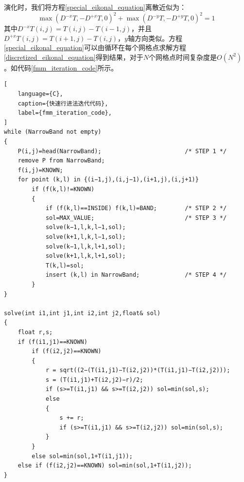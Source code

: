 演化时，我们将方程\ref{special_eikonal_equation}离散近似为：
\begin{equation}
    \label{discretized_eikonal_equation}
    \max(D^{-x}T, -D^{+x}T, 0)^2 + \max(D^{-y}T, -D^{+y}T, 0)^2 = 1
\end{equation}
其中$D^{-x}T(i, j) = T(i, j) - T(i - 1, j)$，并且$D^{+x}T(i, j) = T(i + 1, j) - T(i, j)$，$y$轴方向类似。方程\ref{special_eikonal_equation}可以由循环在每个网格点求解方程\ref{discretized_eikonal_equation}得到结果，对于$N$个网格点时间复杂度是$O(N^2)$。如代码\ref{fmm_iteration_code}所示。
\begin{lstlisting}[
    language={C},
    caption={快速行进法迭代代码},
    label={fmm_iteration_code},
]
while (NarrowBand not empty)
{
    P(i,j)=head(NarrowBand); 						/* STEP 1 */
    remove P from NarrowBand;
    f(i,j)=KNOWN;
    for point (k,l) in {(i−1,j),(i,j−1),(i+1,j),(i,j+1)}
        if (f(k,l)!=KNOWN)
        {
            if (f(k,l)==INSIDE) f(k,l)=BAND; 	    /* STEP 2 */
            sol=MAX_VALUE; 							/* STEP 3 */
            solve(k−1,l,k,l−1,sol);
            solve(k+1,l,k,l−1,sol);
            solve(k−1,l,k,l+1,sol);
            solve(k+1,l,k,l+1,sol);
            T(k,l)=sol;
            insert (k,l) in NarrowBand; 			/* STEP 4 */
        }
}

solve(int i1,int j1,int i2,int j2,float& sol)
{
    float r,s;
    if (f(i1,j1)==KNOWN)
        if (f(i2,j2)==KNOWN)
        {
            r = sqrt((2−(T(i1,j1)−T(i2,j2))*(T(i1,j1)−T(i2,j2)));
            s = (T(i1,j1)+T(i2,j2)−r)/2;
            if (s>=T(i1,j1) && s>=T(i2,j2)) sol=min(sol,s);
            else
            {
                s += r;
                if (s>=T(i1,j1) && s>=T(i2,j2)) sol=min(sol,s);
            }
        }
        else sol=min(sol,1+T(i1,j1));
    else if (f(i2,j2)==KNOWN) sol=min(sol,1+T(i1,j2));
}
\end{lstlisting}

